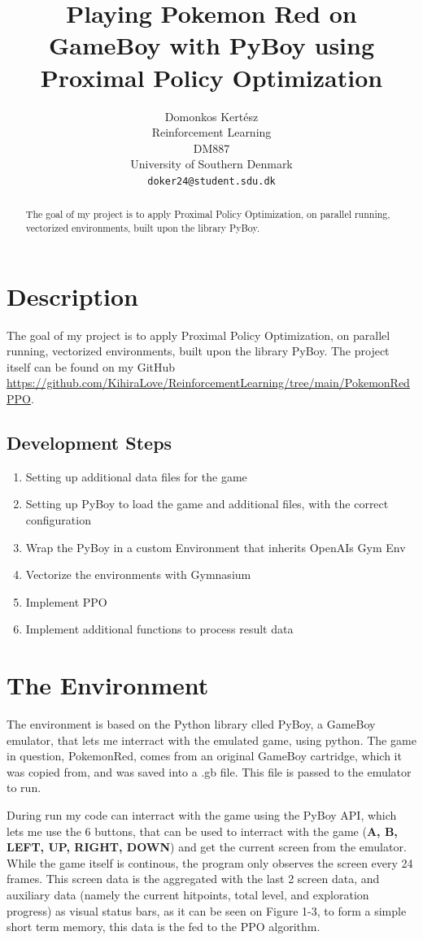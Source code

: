 \documentclass{article}
\title{Playing Pokemon Red on GameBoy with PyBoy using Proximal Policy Optimization}
\author{
	Domonkos Kertész\\
	Reinforcement Learning\\
	DM887\\
  	University of Southern Denmark\\
  	\texttt{doker24@student.sdu.dk}}
\begin{document}
\maketitle


\begin{abstract}
	The goal of my project is to apply Proximal Policy Optimization, on parallel running,
	vectorized environments, built upon the library PyBoy.
\end{abstract}


\section{Description}


	The goal of my project is to apply Proximal Policy Optimization, on parallel running,
	vectorized environments, built upon the library PyBoy. The project itself can be found on my GitHub
	\url{https://github.com/KihiraLove/ReinforcementLearning/tree/main/PokemonRedPPO}.
	
\subsection{Development Steps}
	\begin{enumerate}
		\item Setting up additional data files for the game
		\item Setting up PyBoy to load the game and additional files, with the correct configuration
		\item Wrap the PyBoy in a custom Environment that inherits OpenAIs Gym Env
		\item Vectorize the environments with Gymnasium
		\item Implement PPO
		\item Implement additional functions to process result data
	\end{enumerate}

\section{The Environment}
	The environment is based on the Python library clled PyBoy, a GameBoy emulator, that lets me interract with the emulated game, using python. The game in question, PokemonRed, comes from an original GameBoy cartridge, which it was copied from, and was saved into a .gb file. This file is passed to the emulator to run. 

	
	During run my code can interract with the game using the PyBoy API, which lets me use the 6 buttons, that can be used to interract with the game ({\bf A, B, LEFT, UP, RIGHT, DOWN}) and get the current screen from the emulator. While the game itself is continous, the program only observes the screen every 24 frames. This screen data is the aggregated with the last 2 screen data, and auxiliary data (namely the current hitpoints, total level, and exploration progress) as visual status bars, as it can be seen on Figure 1-3, to form a simple short term memory, this data is the fed to the PPO algorithm.
\end{document}
